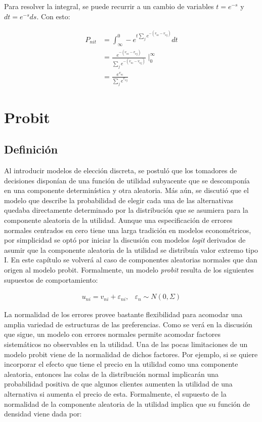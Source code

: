 \documentclass[
]{book}
\begin{document}
Para resolver la integral, se puede recurrir a un cambio de variables \(t = e^{−s}\) y \(dt = e^{−s}ds\). Con esto:

\[
\begin{aligned}
P_{nit} &= \int_{\infty}^{0} -e^{t\sum_{j}  e^{-(v_{ni} - v_{nj})}} dt\\
&= \frac{ e^{-(v_{ni} - v_{nj})}}{\sum_{j}  e^{-(v_{ni} - v_{nj})}}\mid^{\infty}_{0}\\
&= \frac{e^{v_{ni}}}{\sum_j e^{v_{nj}}}
\end{aligned}
\]

\section{Probit}\label{probit}

\subsection{Definición}\label{definiciuxf3n}

Al introducir modelos de elección discreta, se postuló que los tomadores de decisiones disponían de una función de utilidad subyacente que se descomponía en una componente determinística y otra aleatoria. Más aún, se discutió que el modelo que describe la probabilidad de elegir cada una de las alternativas quedaba directamente determinado por la distribución que se asumiera para la componente aleatoria de la utilidad. Aunque una especificación de errores normales centrados en cero tiene una larga tradición en modelos econométricos, por simplicidad se optó por iniciar la discusión con modelos \emph{logit} derivados de asumir que la componente aleatoria de la utilidad se distribuía valor extremo tipo I. En este capítulo se volverá al caso de componentes aleatorias normales que dan origen al modelo probit. Formalmente, un modelo \emph{probit} resulta de los siguientes supuestos de comportamiento:

\begin{equation} 
  \begin{array}{cc}
  u_{ni} = v_{ni} + \varepsilon_{ni}, &\varepsilon_n \sim N(0,\Sigma)
  \end{array}  
  \label{eq:compo}
\end{equation}

La normalidad de los errores provee bastante flexibilidad para acomodar una amplia variedad de estructuras de las preferencias. Como se verá en la discusión que sigue, un modelo con errores normales permite acomodar factores sistemáticos no observables en la utilidad. Una de las pocas limitaciones de un modelo probit viene de la normalidad de dichos factores. Por ejemplo, si se quiere incorporar el efecto que tiene el precio en la utilidad como una componente aleatoria, entonces las colas de la distribución normal implicarán una probabilidad positiva de que algunos clientes aumenten la utilidad de una alternativa si aumenta el precio de esta. Formalmente, el supuesto de la normalidad de la componente aleatoria de la utilidad implica que su función de densidad viene dada por:
\end{document}
